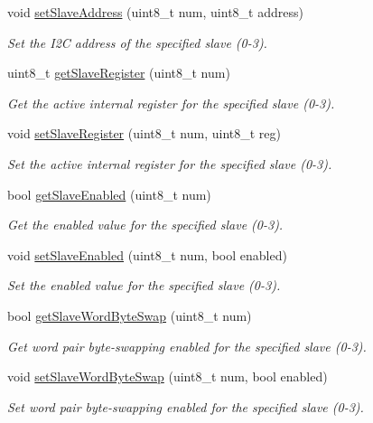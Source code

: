\begin{DoxyCompactItemize}
void \mbox{\hyperlink{classMPU6050_a3c07eb2c59fff3ddc7186319ee40ba6f}{set\+Slave\+Address}} (uint8\+\_\+t num, uint8\+\_\+t address)
\begin{DoxyCompactList}\small\item\em Set the I2C address of the specified slave (0-\/3). \end{DoxyCompactList}\item 
uint8\+\_\+t \mbox{\hyperlink{classMPU6050_ae7e9ead9645bcef326eb579c6ab5d5ff}{get\+Slave\+Register}} (uint8\+\_\+t num)
\begin{DoxyCompactList}\small\item\em Get the active internal register for the specified slave (0-\/3). \end{DoxyCompactList}\item 
void \mbox{\hyperlink{classMPU6050_a62851e982059a2462d52c210ad764a1c}{set\+Slave\+Register}} (uint8\+\_\+t num, uint8\+\_\+t reg)
\begin{DoxyCompactList}\small\item\em Set the active internal register for the specified slave (0-\/3). \end{DoxyCompactList}\item 
bool \mbox{\hyperlink{classMPU6050_a5f14bde83fe00b27dec6776fc44e89c2}{get\+Slave\+Enabled}} (uint8\+\_\+t num)
\begin{DoxyCompactList}\small\item\em Get the enabled value for the specified slave (0-\/3). \end{DoxyCompactList}\item 
void \mbox{\hyperlink{classMPU6050_afaffa021d7bb41f3a288827080602eee}{set\+Slave\+Enabled}} (uint8\+\_\+t num, bool enabled)
\begin{DoxyCompactList}\small\item\em Set the enabled value for the specified slave (0-\/3). \end{DoxyCompactList}\item 
bool \mbox{\hyperlink{classMPU6050_a18e8f3d053a68f0e5ecf497c87ecac8a}{get\+Slave\+Word\+Byte\+Swap}} (uint8\+\_\+t num)
\begin{DoxyCompactList}\small\item\em Get word pair byte-\/swapping enabled for the specified slave (0-\/3). \end{DoxyCompactList}\item 
void \mbox{\hyperlink{classMPU6050_abeb1f83652066d7543fd3283af794364}{set\+Slave\+Word\+Byte\+Swap}} (uint8\+\_\+t num, bool enabled)
\begin{DoxyCompactList}\small\item\em Set word pair byte-\/swapping enabled for the specified slave (0-\/3). \end{DoxyCompactList}\item 

\end{DoxyCompactItemize}
